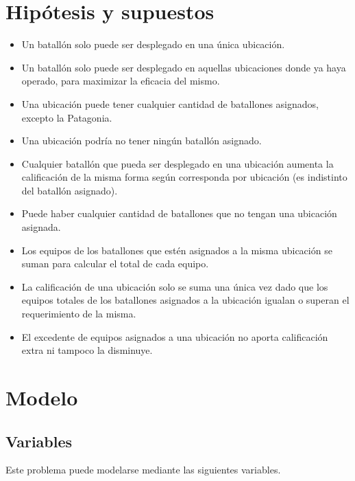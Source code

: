 \documentclass[12pt]{article}
\begin{document}
\section{Hipótesis y supuestos}

\begin{itemize}
\item Un batallón solo puede ser desplegado en una única ubicación.
\item Un batallón solo puede ser desplegado en aquellas ubicaciones donde ya haya operado, para maximizar la eficacia del mismo.
\item Una ubicación puede tener cualquier cantidad de batallones asignados, excepto la Patagonia.
\item Una ubicación podría no tener ningún batallón asignado.
\item Cualquier batallón que pueda ser desplegado en una ubicación aumenta la calificación de la misma forma según corresponda por ubicación (es indistinto del batallón asignado).
\item Puede haber cualquier cantidad de batallones que no tengan una ubicación asignada.
\item Los equipos de los batallones que estén asignados a la misma ubicación se suman para calcular el total de cada equipo.
\item La calificación de una ubicación solo se suma una única vez dado que los equipos totales de los batallones asignados a la ubicación igualan o superan el requerimiento de la misma.
\item El excedente de equipos asignados a una ubicación no aporta calificación extra ni tampoco la disminuye.
\end{itemize}

\section{Modelo}

\subsection{Variables}

Este problema puede modelarse mediante las siguientes variables.
\end{document}
